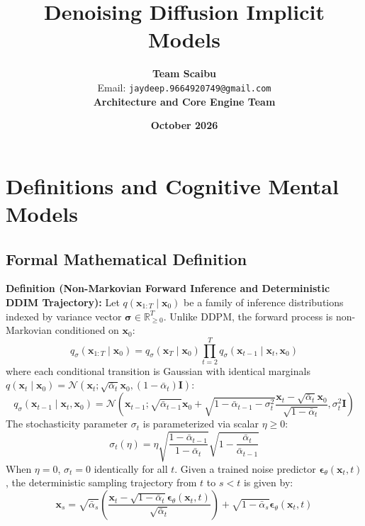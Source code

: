 \documentclass[11pt,a4paper]{article}
\title{\textbf{Denoising Diffusion Implicit Models}}
\author{\textbf{Team Scaibu} \\ \small Email: \texttt{jaydeep.9664920749@gmail.com} \\ \small \textbf{Architecture and Core Engine Team}}
\date{\textbf{October 2026}}
\theoremstyle{definition}
\begin{document}
\maketitle

\section{Definitions and Cognitive Mental Models}

\subsection{Formal Mathematical Definition}
\textbf{Definition (Non-Markovian Forward Inference and Deterministic DDIM Trajectory):}
Let $q(\mathbf{x}_{1:T} \mid \mathbf{x}_0)$ be a family of inference distributions indexed by variance vector $\boldsymbol{\sigma} \in \mathbb{R}^T_{\ge 0}$. Unlike DDPM, the forward process is non-Markovian conditioned on $\mathbf{x}_0$:
{\boldmath
\begin{equation}
q_\sigma(\mathbf{x}_{1:T} \mid \mathbf{x}_0) = q_\sigma(\mathbf{x}_T \mid \mathbf{x}_0) \prod_{t=2}^T q_\sigma(\mathbf{x}_{t-1} \mid \mathbf{x}_t, \mathbf{x}_0)
\end{equation}
}
where each conditional transition is Gaussian with identical marginals $q(\mathbf{x}_t \mid \mathbf{x}_0) = \mathcal{N}\left(\mathbf{x}_t; \sqrt{\bar{\alpha}_t}\mathbf{x}_0, (1 - \bar{\alpha}_t)\mathbf{I}\right)$:
{\boldmath
\begin{equation}
q_\sigma(\mathbf{x}_{t-1} \mid \mathbf{x}_t, \mathbf{x}_0) = \mathcal{N}\left(\mathbf{x}_{t-1}; \sqrt{\bar{\alpha}_{t-1}}\mathbf{x}_0 + \sqrt{1 - \bar{\alpha}_{t-1} - \sigma_t^2} \frac{\mathbf{x}_t - \sqrt{\bar{\alpha}_t}\mathbf{x}_0}{\sqrt{1 - \bar{\alpha}_t}}, \sigma_t^2 \mathbf{I}\right)
\end{equation}
}
The stochasticity parameter $\sigma_t$ is parameterized via scalar $\eta \ge 0$:
{\boldmath
\begin{equation}
\sigma_t(\eta) = \eta \sqrt{\frac{1 - \bar{\alpha}_{t-1}}{1 - \bar{\alpha}_t}} \sqrt{1 - \frac{\bar{\alpha}_t}{\bar{\alpha}_{t-1}}}
\end{equation}
}
When $\eta = 0$, $\sigma_t = 0$ identically for all $t$. Given a trained noise predictor $\boldsymbol{\epsilon}_\theta(\mathbf{x}_t, t)$, the deterministic sampling trajectory from $t$ to $s < t$ is given by:
{\boldmath
\begin{equation}
\mathbf{x}_s = \sqrt{\bar{\alpha}_s} \left( \frac{\mathbf{x}_t - \sqrt{1 - \bar{\alpha}_t}\boldsymbol{\epsilon}_\theta(\mathbf{x}_t, t)}{\sqrt{\bar{\alpha}_t}} \right) + \sqrt{1 - \bar{\alpha}_s} \boldsymbol{\epsilon}_\theta(\mathbf{x}_t, t)
\end{equation}
}
\end{document}
